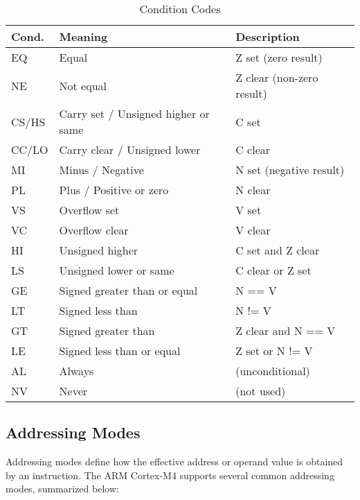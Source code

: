\begin{table}[H]
\centering
\caption{Condition Codes}
\small
\begin{tabularx}{\linewidth}{@{}l l X@{}}
\toprule
\textbf{Cond.} & \textbf{Meaning} & \textbf{Description} \\
\midrule
EQ  & Equal          & Z set (zero result) \\
NE  & Not equal      & Z clear (non-zero result) \\
CS/HS & Carry set / Unsigned higher or same & C set \\
CC/LO & Carry clear / Unsigned lower & C clear \\
MI  & Minus / Negative & N set (negative result) \\
PL  & Plus / Positive or zero & N clear \\
VS  & Overflow set   & V set \\
VC  & Overflow clear & V clear \\
HI  & Unsigned higher & C set and Z clear \\
LS  & Unsigned lower or same & C clear or Z set \\
GE  & Signed greater than or equal & N == V \\
LT  & Signed less than & N != V \\
GT  & Signed greater than & Z clear and N == V \\
LE  & Signed less than or equal & Z set or N != V \\
AL  & Always         & (unconditional) \\
NV  & Never          & (not used) \\
\bottomrule
\end{tabularx}
\vspace{2pt}
\end{table}
\subsection{Addressing Modes}

Addressing modes define how the effective address or operand value is obtained by an instruction. 
The ARM Cortex-M4 supports several common addressing modes, summarized below:

